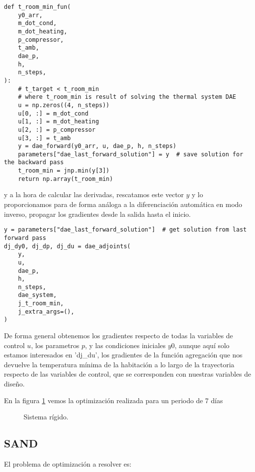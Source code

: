 \begin{verbatim}
def t_room_min_fun(
    y0_arr,
    m_dot_cond,
    m_dot_heating,
    p_compressor,
    t_amb,
    dae_p,
    h,
    n_steps,
):
    # t_target < t_room_min
    # where t_room_min is result of solving the thermal system DAE
    u = np.zeros((4, n_steps))
    u[0, :] = m_dot_cond
    u[1, :] = m_dot_heating
    u[2, :] = p_compressor
    u[3, :] = t_amb
    y = dae_forward(y0_arr, u, dae_p, h, n_steps)
    parameters["dae_last_forward_solution"] = y  # save solution for the backward pass
    t_room_min = jnp.min(y[3])
    return np.array(t_room_min)
\end{verbatim}

y a la hora de calcular las derivadas, rescatamos este vector $y$ y lo
proporcionamos para de forma análoga a la diferenciación automática en modo
inverso, propagar los gradientes desde la salida hasta el inicio.

\begin{verbatim}
y = parameters["dae_last_forward_solution"]  # get solution from last forward pass
dj_dy0, dj_dp, dj_du = dae_adjoints(
    y,
    u,
    dae_p,
    h,
    n_steps,
    dae_system,
    j_t_room_min,
    j_extra_args=(),
)
\end{verbatim}

De forma general obtenemos los gradientes respecto de todas la variables de
control $u$, los parametros $p$, y las condiciones iniciales $y0$, aunque aquí
solo estamos interesados en 'dj\_du', los gradientes de la función agregación
que nos devuelve la temperatura mínima de la habitación a lo largo de la
trayectoria respecto de las variables de control, que se corresponden con
nuestras variables de diseño.


En la figura \ref{fig:control_adjoints_7_days} vemos la optimización realizada
para un periodo de 7 días

\begin{figure}[h] \centering
	\centering
	
	\caption{Sistema rígido.}
	\label{fig:control_adjoints_7_days}
\end{figure}



\clearpage
\subsection{SAND}

El problema de optimización a resolver es:

